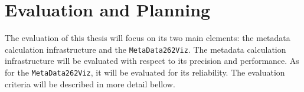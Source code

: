 \documentclass[runningheads]{llncs}
\begin{document}
\section{Evaluation and Planning}
\label{sec:Evaluation and Planning}





The evaluation of this thesis will focus on its two main elements: the metadata calculation infrastructure and the \texttt{MetaData262Viz}. The metadata calculation infrastructure will be evaluated with respect to its precision and performance. As for the \texttt{MetaData262Viz}, it will be evaluated for its reliability. The evaluation criteria will be described in more detail bellow.

\end{document}
